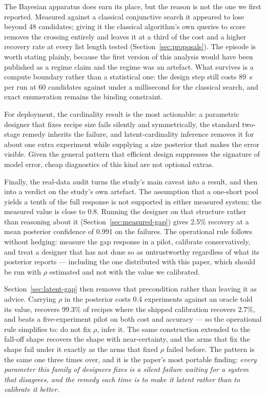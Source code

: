 \documentclass[11pt]{article}
\begin{document}
The Bayesian apparatus does earn its place, but the reason is not the one we
first reported. Measured against a classical conjunctive search it appeared to
lose beyond 48 candidates; giving it the classical algorithm's own queries to
score removes the crossing entirely and leaves it at a third of the cost and a
higher recovery rate at every list length tested
(Section~\ref{sec:proposals}). The episode is worth stating plainly, because
the first version of this analysis would have been published as a regime
claim and the regime was an artefact. What survives is a compute boundary
rather than a statistical one: the design step still costs 89~s per run at 60
candidates against under a millisecond for the classical search, and exact
enumeration remains the binding constraint.

For deployment, the cardinality result is the most actionable: a parametric
designer that fixes recipe size fails silently and symmetrically, the standard
two-stage remedy inherits the failure, and latent-cardinality inference removes
it for about one extra experiment while supplying a size posterior that makes
the error visible. Given the general pattern that efficient design suppresses
the signature of model error, cheap diagnostics of this kind are not optional
extras.

Finally, the real-data audit turns the study's main caveat into a result, and
then into a verdict on the study's own artefact. The assumption that a one-short
pool yields a tenth of the full response is not supported in either measured
system; the measured value is close to 0.8. Running the designer on that
structure rather than reasoning about it (Section~\ref{sec:measured-gap}) gives
2.5\% recovery at a mean posterior confidence of 0.991 on the failures. The
operational rule follows without hedging: measure the gap response in a pilot,
calibrate conservatively, and treat a designer that has not done so as
untrustworthy regardless of what its posterior reports --- including the one
distributed with this paper, which should be run with $\rho$ estimated and not
with the value we calibrated.

Section~\ref{sec:latent-gap} then removes that precondition rather than
leaving it as advice. Carrying $\rho$ in the posterior costs 0.4 experiments
against an oracle told its value, recovers 99.3\% of recipes where the shipped
calibration recovers 2.7\%, and beats a five-experiment pilot on both cost and
accuracy --- so the operational rule simplifies to: do not fix $\rho$, infer
it. The same construction extended to the fall-off shape recovers the shape
with near-certainty, and the arms that fix the shape fail under it exactly as
the arms that fixed $\rho$ failed before. The pattern is the same one three
times over, and it is the paper's most portable finding: \emph{every
parameter this family of designers fixes is a silent failure waiting for a
system that disagrees, and the remedy each time is to make it latent rather
than to calibrate it better.}
\end{document}
